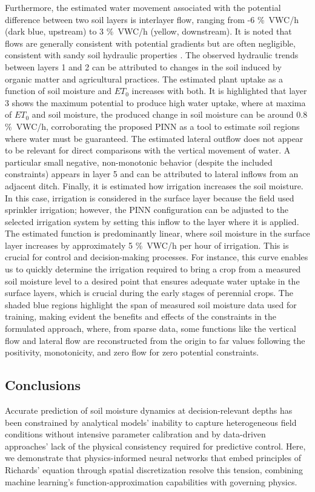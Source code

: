 \documentclass[pdflatex,sn-nature]{sn-jnl}%
\theoremstyle{thmstyleone}%
\theoremstyle{thmstyletwo}%
\theoremstyle{thmstylethree}%
\begin{document}
Furthermore, the estimated water movement associated with the potential difference between two soil layers is interlayer flow, ranging from -6 \si{\% VWC/h} (dark blue, upstream) to 3 \si{\%VWC/h} (yellow, downstream). It is noted that flows are generally consistent with potential gradients but are often negligible, consistent with sandy soil hydraulic properties \cite{Reyes2016}. The observed hydraulic trends between layers 1 and 2 can be attributed to changes in the soil induced by organic matter and agricultural practices.
The estimated plant uptake as a function of soil moisture and $ET_0$ increases with both. It is highlighted that layer 3 shows the maximum potential to produce high water uptake, where at maxima of $ET_0$ and soil moisture, the produced change in soil moisture can be around 0.8 \si{\%VWC/h}, corroborating the proposed PINN as a tool to estimate soil regions where water must be guaranteed.
The estimated lateral outflow does not appear to be relevant for direct comparisons with the vertical movement of water. A particular small negative, non-monotonic behavior (despite the included constraints) appears in layer 5 and can be attributed to lateral inflows from an adjacent ditch.
Finally, it is estimated how irrigation increases the soil moisture. In this case, irrigation is considered in the surface layer because the field used sprinkler irrigation; however, the PINN configuration can be adjusted to the selected irrigation system by setting this inflow to the layer where it is applied. The estimated function is predominantly linear, where soil moisture in the surface layer increases by approximately 5 \si{\%VWC/h} per hour of irrigation. This is crucial for control and decision-making processes. For instance, this curve enables us to quickly determine the irrigation required to bring a crop from a measured soil moisture level to a desired point that ensures adequate water uptake in the surface layers, which is crucial during the early stages of perennial crops.
The shaded blue regions highlight the span of measured soil moisture data used for training, making evident the benefits and effects of the constraints in the formulated approach, where, from sparse data, some functions like the vertical flow and lateral flow are reconstructed from the origin to far values following the positivity, monotonicity, and zero flow for zero potential constraints.

  
\subsection{Conclusions}
Accurate prediction of soil moisture dynamics at decision-relevant depths has been constrained by analytical models' inability to capture heterogeneous field conditions without intensive parameter calibration and by data-driven approaches' lack of the physical consistency required for predictive control. Here, we demonstrate that physics-informed neural networks that embed principles of Richards' equation through spatial discretization resolve this tension, combining machine learning's function-approximation capabilities with governing physics.
\end{document}
